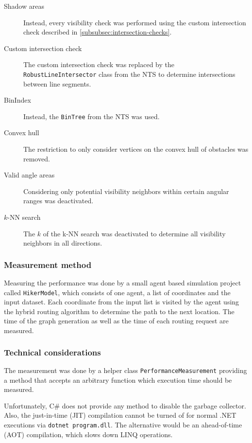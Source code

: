 			\begin{description}
				\item[Shadow areas] Instead, every visibility check was performed using the custom intersection check described in \cref{subsubsec:intersection-checks}.
				\item[Custom intersection check] The custom intersection check was replaced by the \texttt{RobustLineIntersector} class from the NTS to determine intersections between line segments.
				\item[BinIndex] Instead, the \texttt{BinTree} from the NTS was used.
				\item[Convex hull] The restriction to only consider vertices on the convex hull of obstacles was removed.
				\item[Valid angle areas] Considering only potential visibility neighbors within certain angular ranges was deactivated.
				\item[$k$-NN search] The $k$ of the k-NN search was deactivated to determine all visibility neighbors in all directions.
			\end{description}			
		\subsubsection{Measurement method}
		
			Measuring the performance was done by a small agent based simulation project called \texttt{HikerModel}, which consists of one agent, a list of coordinates and the input dataset.
			Each coordinate from the input list is visited by the agent using the hybrid routing algorithm to determine the path to the next location.
			The time of the graph generation as well as the time of each routing request are measured.
		
		\subsubsection{Technical considerations}
		
			The measurement was done by a helper class \texttt{PerformanceMeasurement} providing a method that accepts an arbitrary function which execution time should be measured.
			
			Unfortunately, C\# does not provide any method to disable the garbage collector.
			Also, the just-in-time (JIT) compilation cannot be turned of for normal .NET executions via \texttt{dotnet program.dll}.
			The alternative would be an ahead-of-time (AOT) compilation, which slows down LINQ operations.


